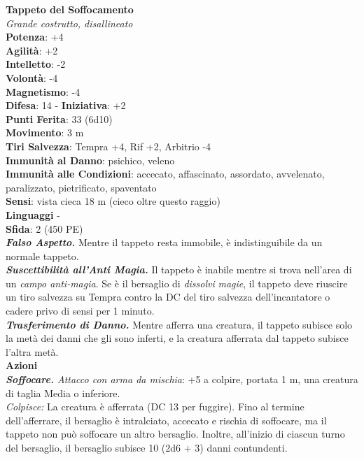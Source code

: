 \begin{multicols}{2}
\medskip\textbf{Tappeto del Soffocamento}\\
\emph{Grande costrutto, disallineato}\\
\textbf{Potenza}: +4\\
\textbf{Agilità}: +2\\
\textbf{Intelletto}: -2\\
\textbf{Volontà}: -4\\
\textbf{Magnetismo}: -4\\
\textbf{Difesa}: 14 - \textbf{Iniziativa}: +2\\
\textbf{Punti Ferita}: 33 (6d10)\\
\textbf{Movimento}: 3 m\\
\textbf{Tiri Salvezza}: Tempra +4, Rif +2, Arbitrio -4\\
\textbf{Immunità al Danno}: psichico, veleno\\
\textbf{Immunità alle Condizioni}: accecato, affascinato, assordato, avvelenato, paralizzato, pietrificato, spaventato\\
\textbf{Sensi}: vista cieca 18 m (cieco oltre questo raggio)\\
\textbf{Linguaggi} -\\
\textbf{Sfida}: 2 (450 PE)\smallskip\\
\emph{\textbf{Falso Aspetto.}} Mentre il tappeto resta immobile, è indistinguibile da un normale tappeto.\\

\emph{\textbf{Suscettibilità all'Anti Magia.}} Il tappeto è inabile mentre si trova nell'area di un \emph{campo anti-magia}. Se è il bersaglio di \emph{dissolvi} \emph{magie}, il tappeto deve riuscire un tiro salvezza su Tempra contro la DC del tiro salvezza dell'incantatore o cadere privo di sensi per 1 minuto.\\

\emph{\textbf{Trasferimento di Danno.}} Mentre afferra una creatura, il tappeto subisce solo la metà dei danni che gli sono inferti, e la creatura afferrata dal tappeto subisce l'altra metà.\\

\smallskip\textbf{Azioni}\\

\emph{\textbf{Soffocare.} Attacco con arma da mischia}: +5 a colpire, portata 1 m, una creatura di taglia Media o inferiore.\\

\emph{Colpisce:} La creatura è afferrata (DC 13 per fuggire). Fino al termine dell'afferrare, il bersaglio è intralciato, accecato e rischia di soffocare, ma il tappeto non può soffocare un altro bersaglio. Inoltre, all'inizio di ciascun turno del bersaglio, il bersaglio subisce 10 (2d6 + 3) danni contundenti. 


\end{multicols}
